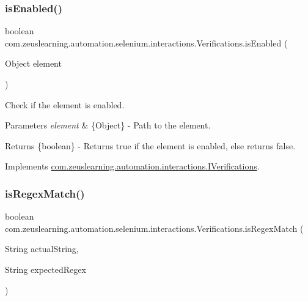 \subsubsection{\texorpdfstring{is\+Enabled()}{isEnabled()}}
{\footnotesize\ttfamily boolean com.\+zeuslearning.\+automation.\+selenium.\+interactions.\+Verifications.\+is\+Enabled (\begin{DoxyParamCaption}\item[{Object}]{element }\end{DoxyParamCaption})\hspace{0.3cm}{\ttfamily [inline]}}

Check if the element is enabled.


\begin{DoxyParams}{Parameters}
{\em element} & \{Object\} -\/ Path to the element. \\
\hline
\end{DoxyParams}
\begin{DoxyReturn}{Returns}
\{boolean\} -\/ Returns {\ttfamily true} if the element is enabled, else returns {\ttfamily false}. 
\end{DoxyReturn}


Implements \hyperlink{interfacecom_1_1zeuslearning_1_1automation_1_1interactions_1_1IVerifications_aa53fca4dbb7f948ef751ac7ebea69f9a}{com.\+zeuslearning.\+automation.\+interactions.\+I\+Verifications}.

\hypertarget{classcom_1_1zeuslearning_1_1automation_1_1selenium_1_1interactions_1_1Verifications_a748c1f8423f37a1d61524e34d30370ab}{}\label{classcom_1_1zeuslearning_1_1automation_1_1selenium_1_1interactions_1_1Verifications_a748c1f8423f37a1d61524e34d30370ab} 
\subsubsection{\texorpdfstring{is\+Regex\+Match()}{isRegexMatch()}}
{\footnotesize\ttfamily boolean com.\+zeuslearning.\+automation.\+selenium.\+interactions.\+Verifications.\+is\+Regex\+Match (\begin{DoxyParamCaption}\item[{String}]{actual\+String,  }\item[{String}]{expected\+Regex }\end{DoxyParamCaption})\hspace{0.3cm}{\ttfamily [inline]}}

